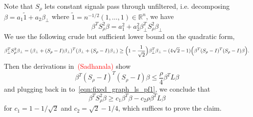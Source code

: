 \documentclass{article}
\newcommand{\Reals}{\mathbb{R}}
\newcommand{\1}{\mathbf{1}}
\newcommand{\wt}[1]{\widetilde{#1}}
\theoremstyle{alden}
\theoremstyle{aldenthm}
\theoremstyle{definition}
\theoremstyle{remark}
\begin{document}
Note that $S_{\rho}$ lets constant signals pass through unfiltered, i.e. decomposing $\beta = a_1 \wt{1} + a_2 \beta_{\perp}$ where $\wt{1} = n^{-1/2}(1,\ldots,1) \in \Reals^n$, we have
\begin{equation}
\label{eqn:fixed_graph_ls_pf1}
\beta^T S_\rho^{2} \beta = a_1^2 + a_2^2 \beta_{\perp}^T S_{\rho}^2 \beta_{\perp}
\end{equation}
We use the following crude but sufficient lower bound on the quadratic form,
\begin{equation*}
\beta_{\perp}^T S_\rho^{2} \beta_{\perp} = (\beta_{\perp} + (S_{\rho} - I)\beta_{\perp})^T (\beta_{\perp} + (S_{\rho} - I)\beta_{\perp}) \geq \Bigl(1 - \frac{1}{\sqrt{2}}\Bigr)\beta_{\perp}^T \beta_{\perp} - (4\sqrt{2} - 1) \Bigl(\beta^T (S_{\rho} - I)^T (S_{\rho} - I)\beta\Bigr).
\end{equation*}
Then the derivations in~\textcolor{red}{(Sadhanala)} show
\begin{equation*}
\beta^T (S_{\rho} - I)^T (S_{\rho} - I)\beta \leq \frac{\rho}{4} \beta^T L \beta
\end{equation*}
and plugging back in to~\eqref{eqn:fixed_graph_ls_pf1}, we conclude that
\begin{equation*}
\beta^T S_{\rho}^2 \beta \geq c_1 \beta^T \beta - c_2 \rho \beta^T L \beta 
\end{equation*}
for $c_1 = 1 - 1/\sqrt{2}$ and $c_2 = \sqrt{2} - 1/4$, which suffices to prove the claim.
\end{document}
